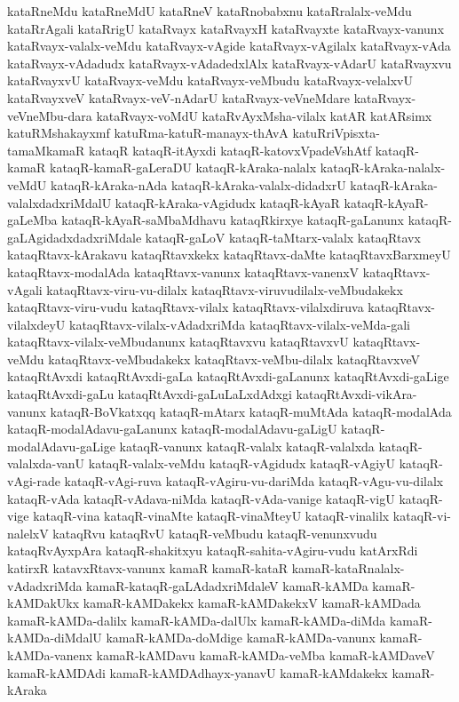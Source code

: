 {kataRneMdu
kataRneMdU
kataRneV
kataRnobabxnu
kataRralalx-veMdu
kataRrAgali
kataRrigU
kataRvayx
kataRvayxH
kataRvayxte
kataRvayx-vanunx
kataRvayx-valalx-veMdu
kataRvayx-vAgide
kataRvayx-vAgilalx
kataRvayx-vAda
kataRvayx-vAdadudx
kataRvayx-vAdadedxlAlx
kataRvayx-vAdarU
kataRvayxvu
kataRvayxvU
kataRvayx-veMdu
kataRvayx-veMbudu
kataRvayx-velalxvU
kataRvayxveV
kataRvayx-veV-nAdarU
kataRvayx-veVneMdare
kataRvayx-veVneMbu-dara
kataRvayx-voMdU
kataRvAyxMsha-vilalx
katAR
katARsimx
katuRMshakayxmf
katuRma-katuR-manayx-thAvA
katuRriVpisxta-tamaMkamaR
kataqR
kataqR-itAyxdi
kataqR-katovxVpadeVshAtf
kataqR-kamaR
kataqR-kamaR-gaLeraDU
kataqR-kAraka-nalalx
kataqR-kAraka-nalalx-veMdU
kataqR-kAraka-nAda
kataqR-kAraka-valalx-didadxrU
kataqR-kAraka-valalxdadxriMdalU
kataqR-kAraka-vAgidudx
kataqR-kAyaR
kataqR-kAyaR-gaLeMba
kataqR-kAyaR-saMbaMdhavu
kataqRkirxye
kataqR-gaLanunx
kataqR-gaLAgidadxdadxriMdale
kataqR-gaLoV
kataqR-taMtarx-valalx
kataqRtavx
kataqRtavx-kArakavu
kataqRtavxkekx
kataqRtavx-daMte
kataqRtavxBarxmeyU
kataqRtavx-modalAda
kataqRtavx-vanunx
kataqRtavx-vanenxV
kataqRtavx-vAgali
kataqRtavx-viru-vu-dilalx
kataqRtavx-viruvudilalx-veMbudakekx
kataqRtavx-viru-vudu
kataqRtavx-vilalx
kataqRtavx-vilalxdiruva
kataqRtavx-vilalxdeyU
kataqRtavx-vilalx-vAdadxriMda
kataqRtavx-vilalx-veMda-gali
kataqRtavx-vilalx-veMbudanunx
kataqRtavxvu
kataqRtavxvU
kataqRtavx-veMdu
kataqRtavx-veMbudakekx
kataqRtavx-veMbu-dilalx
kataqRtavxveV
kataqRtAvxdi
kataqRtAvxdi-gaLa
kataqRtAvxdi-gaLanunx
kataqRtAvxdi-gaLige
kataqRtAvxdi-gaLu
kataqRtAvxdi-gaLuLaLxdAdxgi
kataqRtAvxdi-vikAra-vanunx
kataqR-BoVkatxqq
kataqR-mAtarx
kataqR-muMtAda
kataqR-modalAda
kataqR-modalAdavu-gaLanunx
kataqR-modalAdavu-gaLigU
kataqR-modalAdavu-gaLige
kataqR-vanunx
kataqR-valalx
kataqR-valalxda
kataqR-valalxda-vanU
kataqR-valalx-veMdu
kataqR-vAgidudx
kataqR-vAgiyU
kataqR-vAgi-rade
kataqR-vAgi-ruva
kataqR-vAgiru-vu-dariMda
kataqR-vAgu-vu-dilalx
kataqR-vAda
kataqR-vAdava-niMda
kataqR-vAda-vanige
kataqR-vigU
kataqR-vige
kataqR-vina
kataqR-vinaMte
kataqR-vinaMteyU
kataqR-vinalilx
kataqR-vi-nalelxV
kataqRvu
kataqRvU
kataqR-veMbudu
kataqR-venunxvudu
kataqRvAyxpAra
kataqR-shakitxyu
kataqR-sahita-vAgiru-vudu
katArxRdi
katirxR
katavxRtavx-vanunx
kamaR
kamaR-kataR
kamaR-kataRnalalx-vAdadxriMda
kamaR-kataqR-gaLAdadxriMdaleV
kamaR-kAMDa
kamaR-kAMDakUkx
kamaR-kAMDakekx
kamaR-kAMDakekxV
kamaR-kAMDada
kamaR-kAMDa-dalilx
kamaR-kAMDa-dalUlx
kamaR-kAMDa-diMda
kamaR-kAMDa-diMdalU
kamaR-kAMDa-doMdige
kamaR-kAMDa-vanunx
kamaR-kAMDa-vanenx
kamaR-kAMDavu
kamaR-kAMDa-veMba
kamaR-kAMDaveV
kamaR-kAMDAdi
kamaR-kAMDAdhayx-yanavU
kamaR-kAMdakekx
kamaR-kAraka
}
